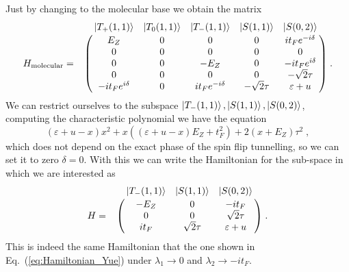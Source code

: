 \documentclass[a4paper,11pt]{article}
\begin{document}
Just by changing to the molecular base we obtain the matrix
\begin{equation}
H_{\text{molecular}}=\bordermatrix{~ & \ket{T_+(1,1)} & \ket{T_0(1,1)} & \ket{T_-(1,1)} & \ket{S(1,1)} & \ket{S(0,2)}\cr
	~ & E_Z   			 & 0     & 0      			  & 0    		   & it_Fe^{-i\delta}	 \cr
	~ & 0     			 & 0     & 0      			  & 0    		   & 0 		  	 		 \cr
	~ & 0     			 & 0     & -E_Z   			  & 0    		   & -it_Fe^{i\delta}    \cr
	~ & 0     			 & 0     & 0      			  & 0    		   & -\sqrt{2}\tau 		 \cr
	~ & -it_Fe^{i\delta} & 0     & it_Fe^{-i\delta}   & -\sqrt{2}\tau  & \varepsilon+u}\; .
\end{equation} We can restrict ourselves to the subspace $\ket{T_-(1,1)}, \ket{S(1,1)}, \ket{S(0,2)}$, computing the characteristic polynomial we have the equation
\begin{equation}
	(\varepsilon+u-x)x^2+x((\varepsilon+u-x)E_Z+t_F^2)+2(x+E_Z)\tau^2\; ,
\end{equation}
which does not depend on the exact phase of the spin flip tunnelling, so we can set it to zero $\delta=0$. With this we can write the Hamiltonian for the sub-space in which we are interested as
\begin{equation}
H=\bordermatrix{~ & \ket{T_-(1,1)} & \ket{S(1,1)} & \ket{S(0,2)}\cr
	~ & -E_Z & 0 & -it_F \cr
	~ & 0 & 0 & \sqrt{2}\tau \cr
	~ & it_F & \sqrt{2}\tau & \varepsilon+u \cr}\; .
\end{equation}
This is indeed the same Hamiltonian that the one shown in Eq.~(\ref{eq:Hamiltonian_Yue}) under $\lambda_1\rightarrow 0$ and $\lambda_2\rightarrow -it_F$.




\end{document}

